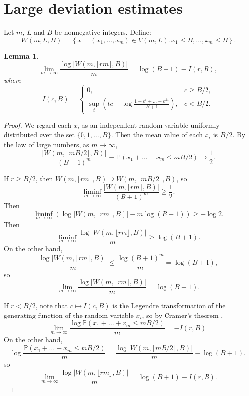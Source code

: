\documentclass[12 pt]{article}
\newcommand{\floor}[1]{\lfloor {#1} \rfloor}
\newtheorem{lem}{Lemma}
\begin{document}
\section{Large deviation estimates}
Let $m$, $L$ and $B$ be nonnegative integers. Define:
\[
W(m, L, B) = \left\{ x = (x_1, \ldots, x_m) \in V(m, L): x_1 \leq B, \ldots, x_m \leq B \right\}.
\]
\begin{lem}\label{large-deviation}
\[
\lim_{m\to\infty} \frac{\log|W(m, \floor{rm}, B)|}{m} = \log(B + 1) - I(r, B),
\]
where
\[
I(c, B) =
\begin{cases}
0, & c \ge B/2,\\
\sup_t \left( tc - \log \frac{1 + e^t + \dots + e^{Bt}}{B + 1} \right), & c < B/2.
\end{cases}
\]
\end{lem}
\begin{proof}
We regard each $x_i$ as an independent random variable uniformly distributed over the set $\{0, 1, \dots, B\}$. Then the mean value of each $x_i$ is $B/2$. By the law of large numbers, as $m \to \infty$,
\[
\frac{|W(m, \floor{mB/2}, B)|}{(B + 1)^m} = \mathbb P(x_1 + \dots + x_m \le mB/2) \to \frac12.
\]

If $r \ge B/2$, then $W(m, \floor{rm}, B) \supseteq W(m, \floor{mB/2}, B)$, so
\[
\liminf_{m\to\infty} \frac{|W(m, \floor{rm}, B)|}{(B + 1)^m} \ge \frac12.
\]
Then
\[
\liminf_{m\to\infty} (\log |W(m, \floor{rm}, B)| - m\log(B + 1)) \ge -\log2.
\]
Then
\[
\liminf_{m\to\infty} \frac{\log |W(m, \floor{rm}, B)|}m \ge \log(B + 1).
\]
On the other hand,
\[
\frac{\log |W(m, \floor{rm}, B)|}m \le \frac{\log (B + 1)^m}m = \log(B + 1),
\]
so
\[
\lim_{m\to\infty} \frac{\log|W(m, \floor{rm}, B)|}{m} = \log(B + 1).
\]

If $r < B/2$, note that $c \mapsto I(c, B)$ is the Legendre transformation of the generating function of the random variable $x_i$, so by Cramer's theorem \cite{Cramer},
\[
\lim_{m\to\infty} \frac{\log\mathbb P(x_1 + \dots + x_m \le mB/2)}{m} = -I(r, B).
\]
On the other hand,
\[
\log \frac{\mathbb P(x_1 + \dots + x_m \le mB/2)}m = \frac{\log|W(m, \floor{mB/2}, B)|}m - \log(B + 1),
\]
so
\[
\lim_{m\to\infty} \frac{\log|W(m, \floor{rm}, B)|}{m} = \log(B + 1) - I(r, B).
\]
\end{proof}
\end{document}

